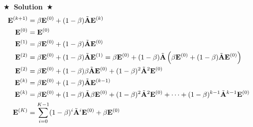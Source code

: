\documentclass[11pt]{article}
\newcommand{\Solution}[1]{{\medskip \color{red} \bf $\bigstar$~\sf \textbf{Solution}~$\bigstar$ \sf #1 } \bigskip}
\begin{document}
\Solution{}
\begin{align}
    \numberwithin{equation}{section} %
    \setcounter{equation}{0} %
    \mathbf{E}^{(k+1)} &= \beta \mathbf{E}^{(0)} + (1-\beta) \tilde{\mathbf{A}} \mathbf{E}^{(k)} \\
    \mathbf{E}^{(0)} &= \mathbf{E}^{(0)} \\
    \mathbf{E}^{(1)} &= \beta \mathbf{E}^{(0)} + (1-\beta) \tilde{\mathbf{A}} \mathbf{E}^{(0)} \\
    \mathbf{E}^{(2)} &= \beta \mathbf{E}^{(0)} + (1-\beta) \tilde{\mathbf{A}} \mathbf{E}^{(1)}= \beta \mathbf{E}^{(0)} + (1-\beta) \tilde{\mathbf{A}} \left( \beta \mathbf{E}^{(0)} + (1-\beta) \tilde{\mathbf{A}} \mathbf{E}^{(0)} \right) \\
    \mathbf{E}^{(2)} &= \beta \mathbf{E}^{(0)} + (1-\beta) \beta \tilde{\mathbf{A}} \mathbf{E}^{(0)} + (1-\beta)^2 \tilde{\mathbf{A}}^2 \mathbf{E}^{(0)} \\
    \mathbf{E}^{(k)} &= \beta \mathbf{E}^{(0)} + (1-\beta) \tilde{\mathbf{A}} \mathbf{E}^{(k-1)} \\
    \mathbf{E}^{(k)} &= \beta \mathbf{E}^{(0)} + (1-\beta) \tilde{\mathbf{A}} \beta \mathbf{E}^{(0)} + (1-\beta)^2 \tilde{\mathbf{A}}^2 \mathbf{E}^{(0)} + \dots + (1-\beta)^{k-1} \tilde{\mathbf{A}}^{k-1} \mathbf{E}^{(0)} \\
    \mathbf{E}^{(K)} &= \sum_{i=0}^{K-1} (1-\beta)^i \tilde{\mathbf{A}}^i \mathbf{E}^{(0)} + \beta \mathbf{E}^{(0)}
\end{align}


 
\end{document}
